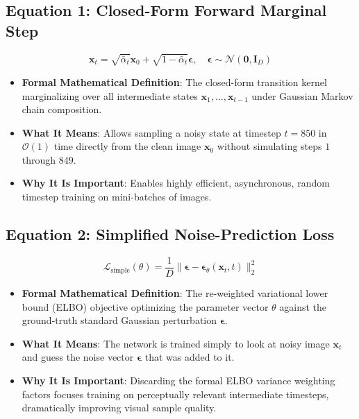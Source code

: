\documentclass[11pt,a4paper]{article}
\theoremstyle{definition}
\begin{document}
\subsection{\textbf{Equation 1: Closed-Form Forward Marginal Step}}
{\boldmath
\begin{equation}
\mathbf{x}_t = \sqrt{\bar{\alpha}_t} \mathbf{x}_0 + \sqrt{1 - \bar{\alpha}_t} \boldsymbol{\epsilon}, \quad \boldsymbol{\epsilon} \sim \mathcal{N}(\mathbf{0}, \mathbf{I}_D)
\end{equation}
}
\begin{itemize}
    \item \textbf{Formal Mathematical Definition}:
    The closed-form transition kernel marginalizing over all intermediate states $\mathbf{x}_1, \dots, \mathbf{x}_{t-1}$ under Gaussian Markov chain composition.
    \item \textbf{What It Means}:
    Allows sampling a noisy state at timestep $t = 850$ in $\mathcal{O}(1)$ time directly from the clean image $\mathbf{x}_0$ without simulating steps $1$ through $849$.
    \item \textbf{Why It Is Important}:
    Enables highly efficient, asynchronous, random timestep training on mini-batches of images.
\end{itemize}

\subsection{\textbf{Equation 2: Simplified Noise-Prediction Loss}}
{\boldmath
\begin{equation}
\mathcal{L}_{\text{simple}}(\theta) = \frac{1}{D} \|\boldsymbol{\epsilon} - \boldsymbol{\epsilon}_\theta(\mathbf{x}_t, t)\|_2^2
\end{equation}
}
\begin{itemize}
    \item \textbf{Formal Mathematical Definition}:
    The re-weighted variational lower bound (ELBO) objective optimizing the parameter vector $\theta$ against the ground-truth standard Gaussian perturbation $\boldsymbol{\epsilon}$.
    \item \textbf{What It Means}:
    The network is trained simply to look at noisy image $\mathbf{x}_t$ and guess the noise vector $\boldsymbol{\epsilon}$ that was added to it.
    \item \textbf{Why It Is Important}:
    Discarding the formal ELBO variance weighting factors focuses training on perceptually relevant intermediate timesteps, dramatically improving visual sample quality.
\end{itemize}
\end{document}
